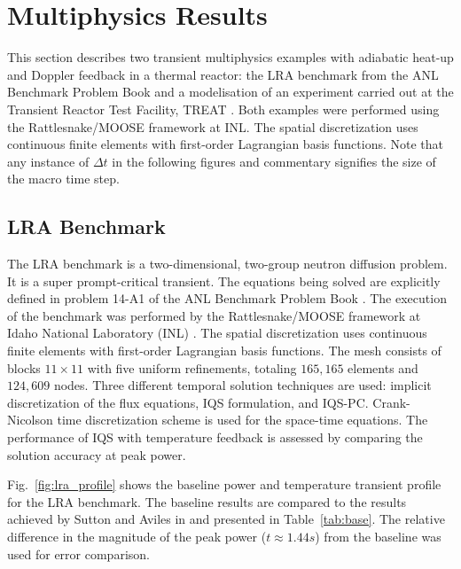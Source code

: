 \documentclass{elsarticle}
\newcommand{\fig}[1]{Fig.~\ref{#1}}                      %
\newcommand{\tbl}[1]{Table~\ref{#1}}                     %
\newcommand{\iqspc}{IQS-PC\xspace}
\begin{document}
\section{Multiphysics Results}

This section describes two transient multiphysics examples with adiabatic heat-up and Doppler feedback in a thermal reactor: the LRA benchmark from the  ANL Benchmark Problem Book \cite{ANL_BPB} 
and a modelisation of an experiment carried out at the Transient Reactor Test Facility, TREAT \cite{mammoth, Tran15}. 
Both examples were performed using the Rattlesnake/MOOSE framework at INL. The spatial discretization uses continuous finite elements with first-order Lagrangian basis functions.
Note that any instance of $\Delta t$ in the following figures and commentary signifies the size of the macro time step.

\subsection{LRA Benchmark}

The LRA benchmark is a two-dimensional, two-group neutron diffusion problem.  
It is a super prompt-critical transient. The equations being solved are explicitly defined in problem 14-A1 of the ANL Benchmark Problem Book \cite{ANL_BPB}. The execution of the benchmark was performed by the Rattlesnake/MOOSE framework at Idaho National Laboratory (INL) \cite{wang2013}.  The spatial discretization uses continuous finite elements with first-order Lagrangian basis functions. The mesh consists of blocks $11\times 11$ with five uniform refinements, totaling $165,165$ elements and $124,609$ nodes. Three different temporal solution techniques are used: implicit discretization of the flux equations, IQS formulation, and \iqspc. Crank-Nicolson time discretization scheme is used for the space-time equations. 
The performance of IQS with temperature feedback is assessed by comparing the solution accuracy at peak power.

\fig{fig:lra_profile} shows the baseline power and temperature transient profile for the LRA benchmark. The baseline results are compared to the results achieved by Sutton and Aviles in \cite{Sutton_1996} and presented in \tbl{tab:base}.  The relative difference in the magnitude of the peak power ($t\approx1.44 s$) from the baseline was used for error comparison.  
\end{document}
